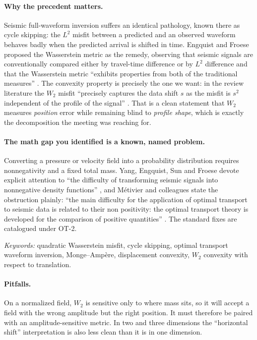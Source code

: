 \documentclass[11pt]{article}
\newcommand{\keywords}[1]{\par\smallskip\noindent\textit{Keywords:} #1}
\begin{document}
\paragraph{Why the precedent matters.} Seismic full-waveform inversion suffers an identical
pathology, known there as cycle skipping: the $L^2$ misfit between a predicted and an
observed waveform behaves badly when the predicted arrival is shifted in time. Engquist and
Froese proposed the Wasserstein metric as the remedy, observing that seismic signals are
conventionally compared either by travel-time difference or by $L^2$ difference and that
the Wasserstein metric ``exhibits properties from both of the traditional measures''
\cite{engquist2014}. The convexity property is precisely the one we want: in the review
literature the $W_2$ misfit ``precisely captures the data shift $s$ as the misfit is $s^2$
independent of the profile of the signal'' \cite{engquistyang}. That is a clean statement
that $W_2$ measures \emph{position} error while remaining blind to \emph{profile shape},
which is exactly the decomposition the meeting was reaching for.

\paragraph{The math gap you identified is a known, named problem.} Converting a pressure or
velocity field into a probability distribution requires nonnegativity and a fixed total
mass. Yang, Engquist, Sun and Froese devote explicit attention to ``the difficulty of
transforming seismic signals into nonnegative density functions'' \cite{yang2016}, and
M\'etivier and colleagues state the obstruction plainly: ``the main difficulty for the
application of optimal transport to seismic data is related to their non positivity: the
optimal transport theory is developed for the comparison of positive quantities''
\cite{metivier2018eage}. The standard fixes are catalogued under OT-2.

\keywords{quadratic Wasserstein misfit, cycle skipping, optimal transport waveform
inversion, Monge--Amp\`ere, displacement convexity, $W_2$ convexity with respect to
translation.}

\paragraph{Pitfalls.} On a normalized field, $W_2$ is sensitive only to where mass sits, so
it will accept a field with the wrong amplitude but the right position. It must therefore be
paired with an amplitude-sensitive metric. In two and three dimensions the ``horizontal
shift'' interpretation is also less clean than it is in one dimension.
\end{document}
